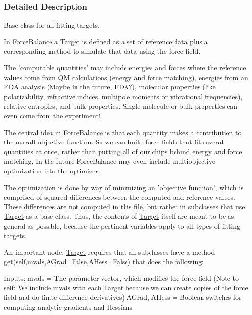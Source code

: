 \subsubsection{\-Detailed \-Description}
\-Base class for all fitting targets. 

\-In \-Force\-Balance a \hyperlink{classforcebalance_1_1target_1_1Target}{\-Target} is defined as a set of reference data plus a corresponding method to simulate that data using the force field.

\-The 'computable quantities' may include energies and forces where the reference values come from \-Q\-M calculations (energy and force matching), energies from an \-E\-D\-A analysis (\-Maybe in the future, \-F\-D\-A?), molecular properties (like polarizability, refractive indices, multipole moments or vibrational frequencies), relative entropies, and bulk properties. \-Single-\/molecule or bulk properties can even come from the experiment!

\-The central idea in \-Force\-Balance is that each quantity makes a contribution to the overall objective function. \-So we can build force fields that fit several quantities at once, rather than putting all of our chips behind energy and force matching. \-In the future \-Force\-Balance may even include multiobjective optimization into the optimizer.

\-The optimization is done by way of minimizing an 'objective function', which is comprised of squared differences between the computed and reference values. \-These differences are not computed in this file, but rather in subclasses that use \hyperlink{classforcebalance_1_1target_1_1Target}{\-Target} as a base class. \-Thus, the contents of \hyperlink{classforcebalance_1_1target_1_1Target}{\-Target} itself are meant to be as general as possible, because the pertinent variables apply to all types of fitting targets.

\-An important node\-: \hyperlink{classforcebalance_1_1target_1_1Target}{\-Target} requires that all subclasses have a method get(self,mvals,\-A\-Grad=\-False,\-A\-Hess=\-False) that does the following\-:

\-Inputs\-: mvals = \-The parameter vector, which modifies the force field (\-Note to self\-: \-We include mvals with each \hyperlink{classforcebalance_1_1target_1_1Target}{\-Target} because we can create copies of the force field and do finite difference derivatives) \-A\-Grad, \-A\-Hess = \-Boolean switches for computing analytic gradients and \-Hessians

